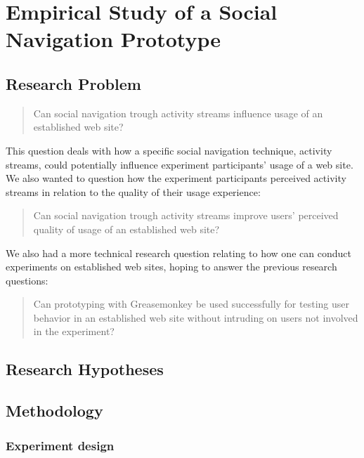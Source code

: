 \chapter{Empirical Study of a Social Navigation Prototype}
\label{chapter:empirical}

\section{Research Problem}

\begin{quote}
  Can social navigation trough activity streams influence
  usage of an established web site?
\end{quote}

This question deals with how a specific social navigation technique, activity
streams, could potentially influence experiment participants' usage of a web
site. We also wanted to question how the experiment participants perceived
activity streams in relation to the quality of their usage experience:

\begin{quote}
  Can social navigation trough activity streams improve users' perceived
  quality of usage of an established web site?
\end{quote}

We also had a more technical research question relating to how one can
conduct experiments on established web sites, hoping to answer the previous
research questions:

\begin{quote}
  Can prototyping with Greasemonkey be used successfully
  for testing user behavior in an established web site without
  intruding on users not involved in the experiment?
\end{quote}

\section{Research Hypotheses}

\section{Methodology}
\label{section:empirical.methodology}

\subsection{Experiment design}

